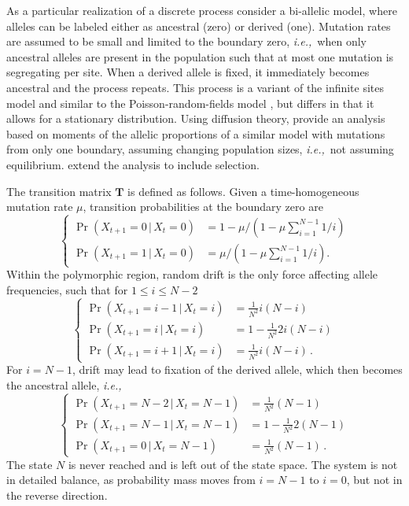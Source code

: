 \documentclass[preprint]{elsarticle}
\newcommand\given{{\,|\,}}
\newcommand\ie{{\it i.e.,}}
\newcommand\x[1]{\ensuremath{X_{#1}}}
\begin{document}
As a particular realization of a discrete process consider a bi-allelic model, where alleles can be labeled either as ancestral (zero) or derived (one). Mutation rates are assumed to be small and limited to the boundary zero, \ie\ when only ancestral alleles are present in the population such that at most one mutation is segregating per site. When a derived allele is fixed, it immediately becomes ancestral and the process repeats. This process is a variant of the infinite sites model \citep{Kimu69} and similar to the Poisson-random-fields model \citep{Sawy92}, but differs in that it allows for a stationary distribution. Using diffusion theory, \citet{Evan07} provide an analysis based on moments of the allelic proportions of a similar model with mutations from only one boundary, assuming changing population sizes, \ie\ not assuming equilibrium. \citet{Zivk15} extend the analysis to include selection. 

The transition matrix $\mathbf{T}$ is defined as follows. Given a time-homogeneous mutation rate $\mu$, transition probabilities at the boundary zero are
\begin{equation}
\begin{cases}
\Pr(\x{t+1}=0\given \x{t}=0)&=1-\mu/(1-\mu\sum_{i=1}^{N-1}1/i)\\
\Pr(\x{t+1}=1\given \x{t}=0)&=\mu/(1-\mu\sum_{i=1}^{N-1}1/i).
\end{cases}
\end{equation}
Within the polymorphic region, random drift is the only force affecting allele frequencies, such that for $1\leq i \leq N-2$
\begin{equation}
\begin{cases}
\Pr(\x{t+1}=i-1\given \x{t}=i) &=\frac1{N^2} i(N-i)\\
\Pr(\x{t+1}=i\given \x{t}=i)   &=1-\frac1{N^2} 2i(N-i)\\
\Pr(\x{t+1}=i+1\given \x{t}=i) &=\frac1{N^2} i(N-i)\,.
\end{cases}
\end{equation}
For $i=N-1$, drift may lead to fixation of the derived allele, which then becomes the ancestral allele, \ie\
\begin{equation}
\begin{cases}
\Pr(\x{t+1}=N-2\given \x{t}=N-1) &=\frac1{N^2} (N-1)\\
\Pr(\x{t+1}=N-1\given \x{t}=N-1) &=1-\frac1{N^2} 2(N-1)\\
\Pr(\x{t+1}=0\given \x{t}=N-1)   &=\frac1{N^2} (N-1)\,.
\end{cases}
\end{equation}
The state $N$ is never reached and is left out of the state space. The system is not in detailed balance, as probability mass moves from $i=N-1$ to $i=0$, but not in the reverse direction.
\end{document}
